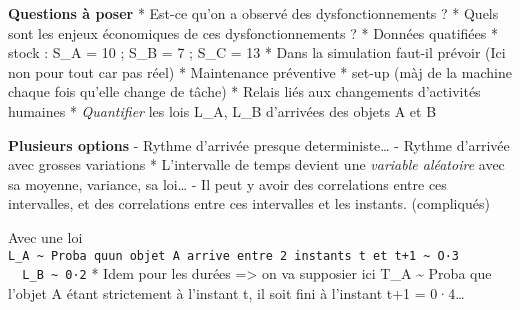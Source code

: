 \documentclass[]{article}
\begin{document}
\textbf{Questions à poser} * Est-ce qu'on a observé des
dysfonctionnements ? * Quels sont les enjeux économiques de ces
dysfonctionnements ? * Données quatifiées * stock : S\_A = 10 ; S\_B = 7
; S\_C = 13 * Dans la simulation faut-il prévoir (Ici non pour tout car
pas réel) * Maintenance préventive * set-up (màj de la machine chaque
fois qu'elle change de tâche) * Relais liés aux changements d'activités
humaines * \emph{Quantifier} les lois L\_A, L\_B d'arrivées des objets A
et B

\textbf{Plusieurs options} - Rythme d'arrivée presque
deterministe\ldots{} - Rythme d'arrivée avec grosses variations *
L'intervalle de temps devient une \emph{variable aléatoire} avec sa
moyenne, variance, sa loi\ldots{} - Il peut y avoir des correlations
entre ces intervalles, et des correlations entre ces intervalles et les
instants. (compliqués)

Avec une loi
\texttt{L\_A\ \textasciitilde{}\ Proba\ qu\textquotesingle{}un\ objet\ A\ arrive\ entre\ 2\ instants\ t\ et\ t+1\ \textasciitilde{}\ O·3\ \ \ \ \ \ \ \ \ L\_B\ \textasciitilde{}\ 0·2}
* Idem pour les durées =\textgreater{} on va supposier ici T\_A
\textasciitilde{} Proba que l'objet A étant strictement à l'instant t,
il soit fini à l'instant t+1 = 0·4\ldots{}
\end{document}
